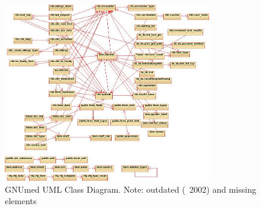 \documentclass[10pt,onecolcolumn,letterpaper]{article}
\begin{document}
\begin{figure}[h!]
    \centering 
    \includegraphics[width=0.8\textwidth]{uml.jpg}
    \caption{GNUmed UML Class Diagram. Note: outdated (~2002) and missing elements \cite{res_medicinae_domainpng_nodate} }
    \label{fig:uml_image} 
\end{figure}













\end{document}
